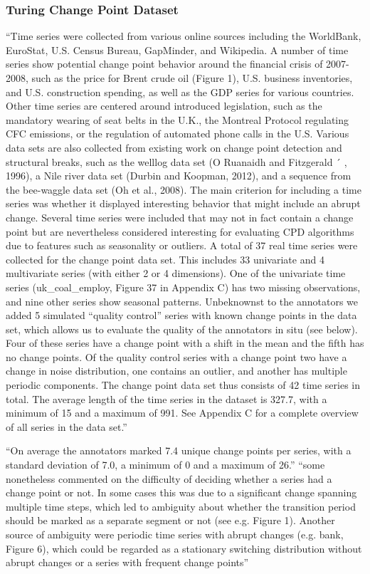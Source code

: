 \subsubsection{Turing Change Point Dataset}
``Time series were collected from various online sources including the WorldBank, EuroStat, U.S.
Census Bureau, GapMinder, and Wikipedia. A number of time series show potential change
point behavior around the financial crisis of 2007-2008, such as the price for Brent crude oil
(Figure 1), U.S. business inventories, and U.S. construction spending, as well as the GDP
series for various countries. Other time series are centered around introduced legislation, such
as the mandatory wearing of seat belts in the U.K., the Montreal Protocol regulating CFC
emissions, or the regulation of automated phone calls in the U.S. Various data sets are also
collected from existing work on change point detection and structural breaks, such as the welllog data set (O Ruanaidh and Fitzgerald ´ , 1996), a Nile river data set (Durbin and Koopman,
2012), and a sequence from the bee-waggle data set (Oh et al., 2008). The main criterion for
including a time series was whether it displayed interesting behavior that might include an
abrupt change. Several time series were included that may not in fact contain a change point
but are nevertheless considered interesting for evaluating CPD algorithms due to features such
as seasonality or outliers.
A total of 37 real time series were collected for the change point data set. This includes 33
univariate and 4 multivariate series (with either 2 or 4 dimensions). One of the univariate time
series (uk\_coal\_employ, Figure 37 in Appendix C) has two missing observations, and nine other
series show seasonal patterns. Unbeknownst to the annotators we added 5 simulated “quality
control” series with known change points in the data set, which allows us to evaluate the quality
of the annotators in situ (see below). Four of these series have a change point with a shift in the
mean and the fifth has no change points. Of the quality control series with a change point two
have a change in noise distribution, one contains an outlier, and another has multiple periodic
components. The change point data set thus consists of 42 time series in total. The average
length of the time series in the dataset is 327.7, with a minimum of 15 and a maximum of 991.
See Appendix C for a complete overview of all series in the data set.''

``On average the annotators marked 7.4 unique change points per series, with a standard deviation of 7.0, a minimum of 0 and a maximum of 26.''
``some nonetheless commented on the difficulty of deciding whether a series had a
change point or not. In some cases this was due to a significant change spanning multiple
time steps, which led to ambiguity about whether the transition period should be marked as
a separate segment or not (see e.g. Figure 1). Another source of ambiguity were periodic
time series with abrupt changes (e.g. bank, Figure 6), which could be regarded as a stationary
switching distribution without abrupt changes or a series with frequent change points''

